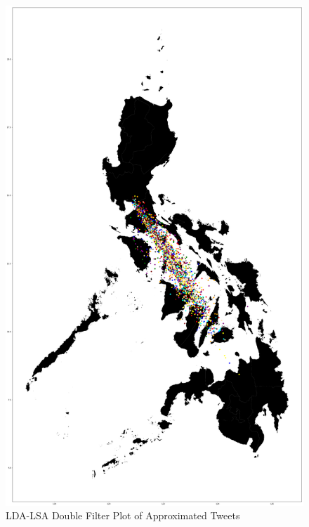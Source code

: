 \begin{figure}
    \centering
    \includegraphics[width=\textwidth, height=\textheight,keepaspectratio]{Method1ApproxMap.png}
    \caption{LDA-LSA Double Filter Plot of Approximated Tweets}
    \label{fig:my_label2}
\end{figure}

